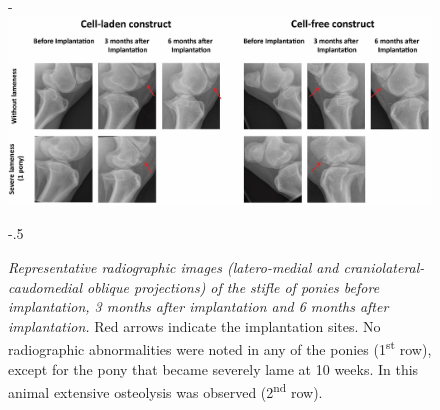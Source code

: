 \documentclass[twocolumn, empirical, authordate, issue]{jote-new-article}
\begin{document}
\begin{figure}
      \captionsetup{width=\dimexpr \linewidth + \fullwidthlen\relax}

\begin{adjustwidth}{-\fullwidthlen}{}
 \includegraphics[width=\columnwidth+\fullwidthlen]{media/image13.jpg}
 \end{adjustwidth}
\begin{adjustwidth}{-.5\fullwidthlen}{}
\caption{\emph{Representative radiographic images (latero-medial and craniolateral-caudomedial oblique projections) of the stifle of ponies before implantation, 3 months after implantation and 6 months after implantation.}  Red arrows indicate the implantation sites. No radiographic abnormalities were noted in any of the ponies (1\textsuperscript{st} row), except for the pony that became severely lame at 10 weeks. In this animal extensive osteolysis was observed (2\textsuperscript{nd} row).}
\label{fig:sup2}
\end{adjustwidth}

\end{figure}
\end{document}
